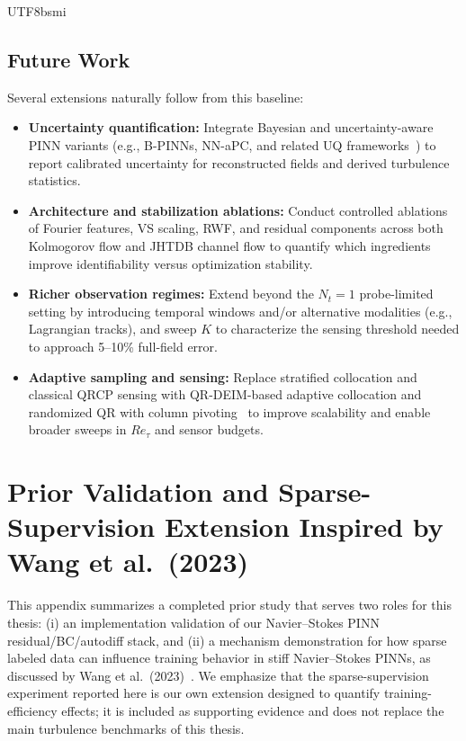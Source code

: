 \documentclass[master]{NTHUthesis}
\begin{document}
\begin{CJK*}{UTF8}{bsmi}
\section*{Future Work}
Several extensions naturally follow from this baseline:
\begin{itemize}
    \item \textbf{Uncertainty quantification:} Integrate Bayesian and uncertainty-aware PINN variants (e.g., B-PINNs, NN-aPC, and related UQ frameworks~\cite{Yang2021JCP, Zhang2019JCP, Psaros2023JCP, Penwarden2022JCP}) to report calibrated uncertainty for reconstructed fields and derived turbulence statistics.
    \item \textbf{Architecture and stabilization ablations:} Conduct controlled ablations of Fourier features, VS scaling, RWF, and residual components across both Kolmogorov flow and JHTDB channel flow to quantify which ingredients improve identifiability versus optimization stability.
    \item \textbf{Richer observation regimes:} Extend beyond the $N_t=1$ probe-limited setting by introducing temporal windows and/or alternative modalities (e.g., Lagrangian tracks), and sweep $K$ to characterize the sensing threshold needed to approach 5--10\% full-field error.
    \item \textbf{Adaptive sampling and sensing:} Replace stratified collocation and classical QRCP sensing with QR-DEIM-based adaptive collocation and randomized QR with column pivoting~\cite{celaya2025adaptive, doi:10.1137/15M1044680} to improve scalability and enable broader sweeps in $Re_\tau$ and sensor budgets.
\end{itemize}

\appendix

\chapter[Prior Validation Study]{Prior Validation and Sparse-Supervision Extension Inspired by Wang et al.\ (2023)}
\label{appendix:wang2023_repro}

This appendix summarizes a completed prior study that serves two roles for this thesis: (i) an implementation validation of our Navier--Stokes PINN residual/BC/autodiff stack, and (ii) a mechanism demonstration for how sparse labeled data can influence training behavior in stiff Navier--Stokes PINNs, as discussed by Wang et al.\ (2023)~\cite{wang2023solutionmultiplicityeffectsdata}. We emphasize that the sparse-supervision experiment reported here is our own extension designed to quantify training-efficiency effects; it is included as supporting evidence and does not replace the main turbulence benchmarks of this thesis.


\end{CJK*}
\end{document}
